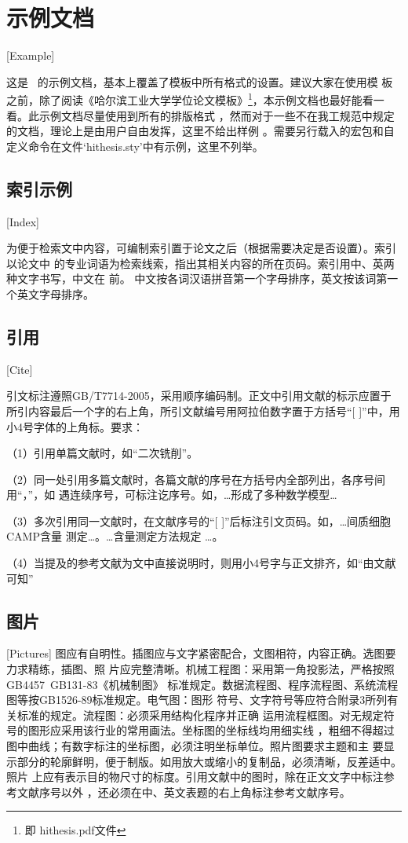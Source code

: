 
\chapter{示例文档}[Example]

这是 \hithesis\ 的示例文档，基本上覆盖了模板中所有格式的设置。建议大家在使用模
板之前，除了阅读《\hithesis\:哈尔滨工业大学学位论文模板》\footnote{即
hithesis.pdf文件}，本示例文档也最好能看一看。此示例文档尽量使用到所有的排版格式
，然而对于一些不在我工规范中规定的文档，理论上是由用户自由发挥，这里不给出样例
。需要另行载入的宏包和自定义命令在文件`hithesis.sty'中有示例，这里不列举。

\section{索引示例}[Index]

为便于检索文中内容，可编制索引置于论文之后（根据需要决定是否设置）。索引以论文中
的专业词语为检索线索，指出其相关内容的所在页码。索引用中、英两种文字书写，中文在
前。
中文按各词汉语拼音第一个字母排序，英文按该词第一个英文字母排序。

\section{引用}[Cite]

引文标注遵照GB/T7714-2005，采用顺序编码制。正文中引用文献的标示应置于所引内容最后一个字的右上角，所引文献编号用阿拉伯数字置于方括号“[ ]”中，用小4号字体的上角标。要求：

（1）引用单篇文献时，如“二次铣削\cite{cnproceed}”。

（2）同一处引用多篇文献时，各篇文献的序号在方括号内全部列出，各序号间用“，”，如
遇连续序号，可标注讫序号。如，…形成了多种数学模型\cite{cnarticle,cnproceed}…

（3）多次引用同一文献时，在文献序号的“[ ]”后标注引文页码。如，…间质细胞CAMP含量
测定\cite[100-197]{cnarticle}…。…含量测定方法规定
\cite[92]{cnarticle}…。

（4）当提及的参考文献为文中直接说明时，则用小4号字与正文排齐，如“由文献可知”

\section{图片}[Pictures]
图应有自明性。插图应与文字紧密配合，文图相符，内容正确。选图要力求精练，插图、照
片应完整清晰。机械工程图：采用第一角投影法，严格按照GB4457~GB131-83《机械制图》
标准规定。数据流程图、程序流程图、系统流程图等按GB1526-89标准规定。电气图：图形
符号、文字符号等应符合附录3所列有关标准的规定。流程图：必须采用结构化程序并正确
运用流程框图。对无规定符号的图形应采用该行业的常用画法。坐标图的坐标线均用细实线
，粗细不得超过图中曲线；有数字标注的坐标图，必须注明坐标单位。照片图要求主题和主
要显示部分的轮廓鲜明，便于制版。如用放大或缩小的复制品，必须清晰，反差适中。照片
上应有表示目的物尺寸的标度。引用文献中的图时，除在正文文字中标注参考文献序号以外
，还必须在中、英文表题的右上角标注参考文献序号。

